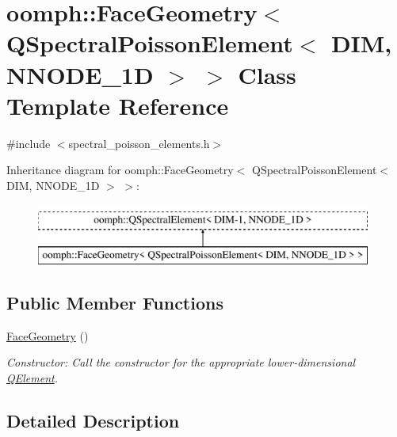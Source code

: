 \hypertarget{classoomph_1_1FaceGeometry_3_01QSpectralPoissonElement_3_01DIM_00_01NNODE__1D_01_4_01_4}{}\section{oomph\+:\+:Face\+Geometry$<$ Q\+Spectral\+Poisson\+Element$<$ D\+IM, N\+N\+O\+D\+E\+\_\+1D $>$ $>$ Class Template Reference}
\label{classoomph_1_1FaceGeometry_3_01QSpectralPoissonElement_3_01DIM_00_01NNODE__1D_01_4_01_4}


{\ttfamily \#include $<$spectral\+\_\+poisson\+\_\+elements.\+h$>$}

Inheritance diagram for oomph\+:\+:Face\+Geometry$<$ Q\+Spectral\+Poisson\+Element$<$ D\+IM, N\+N\+O\+D\+E\+\_\+1D $>$ $>$\+:\begin{figure}[H]
\begin{center}
\leavevmode
\includegraphics[height=2.000000cm]{classoomph_1_1FaceGeometry_3_01QSpectralPoissonElement_3_01DIM_00_01NNODE__1D_01_4_01_4}
\end{center}
\end{figure}
\subsection*{Public Member Functions}
\begin{DoxyCompactItemize}
\item 
\hyperlink{classoomph_1_1FaceGeometry_3_01QSpectralPoissonElement_3_01DIM_00_01NNODE__1D_01_4_01_4_aa4c8a14fe50aa0a5454769b75490d253}{Face\+Geometry} ()
\begin{DoxyCompactList}\small\item\em Constructor\+: Call the constructor for the appropriate lower-\/dimensional \hyperlink{classoomph_1_1QElement}{Q\+Element}. \end{DoxyCompactList}\end{DoxyCompactItemize}


\subsection{Detailed Description}
